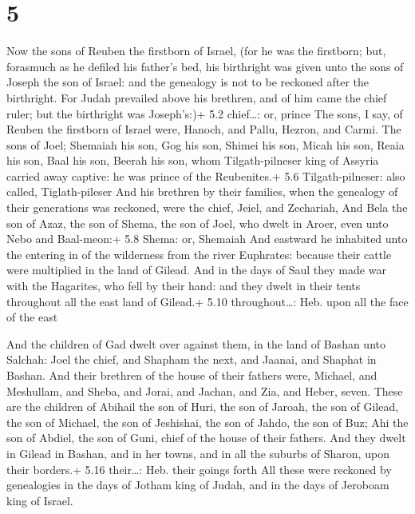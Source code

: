 \hypertarget{section-4}{%
\section{5}\label{section-4}}

 Now the sons of Reuben the firstborn of Israel, (for he was
the firstborn; but, forasmuch as he defiled his father's bed, his
birthright was given unto the sons of Joseph the son of Israel: and the
genealogy is not to be reckoned after the birthright.  For
Judah prevailed above his brethren, and of him came the chief ruler; but
the birthright was Joseph's:)+ 5.2 chief\ldots: or, prince 
The sons, I say, of Reuben the firstborn of Israel were, Hanoch, and
Pallu, Hezron, and Carmi.  The sons of Joel; Shemaiah his
son, Gog his son, Shimei his son,  Micah his son, Reaia his
son, Baal his son,  Beerah his son, whom Tilgath-pilneser
king of Assyria carried away captive: he was prince of the Reubenites.+
5.6 Tilgath-pilneser: also called, Tiglath-pileser  And his
brethren by their families, when the genealogy of their generations was
reckoned, were the chief, Jeiel, and Zechariah,  And Bela
the son of Azaz, the son of Shema, the son of Joel, who dwelt in Aroer,
even unto Nebo and Baal-meon:+ 5.8 Shema: or, Shemaiah  And
eastward he inhabited unto the entering in of the wilderness from the
river Euphrates: because their cattle were multiplied in the land of
Gilead.  And in the days of Saul they made war with the
Hagarites, who fell by their hand: and they dwelt in their tents
throughout all the east land of Gilead.+ 5.10 throughout\ldots: Heb.
upon all the face of the east

 And the children of Gad dwelt over against them, in the
land of Bashan unto Salchah:  Joel the chief, and Shapham
the next, and Jaanai, and Shaphat in Bashan.  And their
brethren of the house of their fathers were, Michael, and Meshullam, and
Sheba, and Jorai, and Jachan, and Zia, and Heber, seven. 
These are the children of Abihail the son of Huri, the son of Jaroah,
the son of Gilead, the son of Michael, the son of Jeshishai, the son of
Jahdo, the son of Buz;  Ahi the son of Abdiel, the son of
Guni, chief of the house of their fathers.  And they dwelt
in Gilead in Bashan, and in her towns, and in all the suburbs of Sharon,
upon their borders.+ 5.16 their\ldots: Heb. their goings forth
 All these were reckoned by genealogies in the days of
Jotham king of Judah, and in the days of Jeroboam king of Israel.

